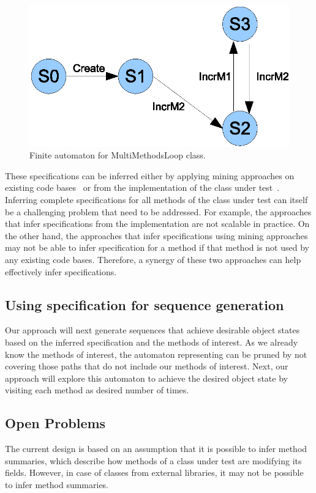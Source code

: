 \begin{figure}[t]
\centering
\includegraphics[scale=0.60,clip]{figs/MultiMethodsLoopFsa1.eps}
\caption{\label{fig:loopfsa}Finite automaton for MultiMethodsLoop class.}
\end{figure}

These specifications can be inferred either by applying mining approaches on existing code bases~\cite{thummalapenta09:mseqgen} or from the implementation of the class under test~\cite{whaley02:interface}. Inferring complete specifications for all methods of the class under test can itself be a challenging problem that need to be addressed. For example, the approaches that infer specifications from the implementation are not scalable in practice. On the other hand, the approaches that infer specifications using mining approaches may not be able to infer specification for a method if that method is not used by any existing code bases. Therefore, a synergy of these two approaches can help effectively infer specifications.

\subsection{Using specification for sequence generation}

Our approach will next generate sequences that achieve desirable object states based on the inferred specification and the methods of interest. As we already know the methods of interest, the automaton representing can be pruned by not covering those paths that do not include our methods of interest. Next, our approach will explore this automaton to achieve the desired object state by visiting each method as desired number of times.

\subsection{Open Problems}

The current design is based on an assumption that it is possible to infer method summaries, which describe how methods of a class under test are modifying its fields. However, in case of classes from external libraries, it may not be possible to infer method summaries. 